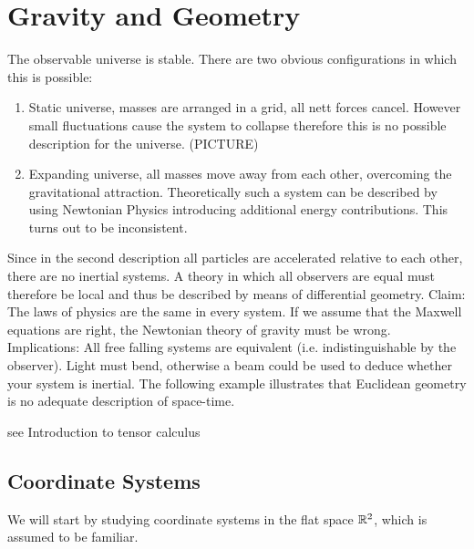 \chapter{Gravity and Geometry}
The observable universe is stable. There are two obvious configurations in which this is possible:
\begin{enumerate}
    \item Static universe, masses are arranged in a grid, all nett forces cancel.
    However small fluctuations cause the system to collapse therefore this is
    no possible description for the universe. (PICTURE)
    \item Expanding universe, all masses move away from each other, overcoming the gravitational attraction.
    Theoretically such a system can be described by using Newtonian Physics introducing additional energy contributions.
    This turns out to be inconsistent.
\end{enumerate}
Since in the second description all particles are accelerated relative to each other, there are no inertial systems.
A theory in which all observers are equal must therefore be local and thus be described by means of differential geometry.
Claim: The laws of physics are the same in every system.
If we assume that the Maxwell equations are right, the Newtonian theory of
gravity must be wrong.
Implications:
All free falling systems are equivalent (i.e. indistinguishable by the observer).
Light must bend, otherwise a beam could be used to deduce whether your system is inertial.
The following example illustrates that Euclidean geometry is no adequate description of space-time.
\begin{example}
see Introduction to tensor calculus
\end{example}
\section{Coordinate Systems}
We will start by studying coordinate systems in the flat space $\mathbb{R}^2$, which
is assumed to be familiar.
